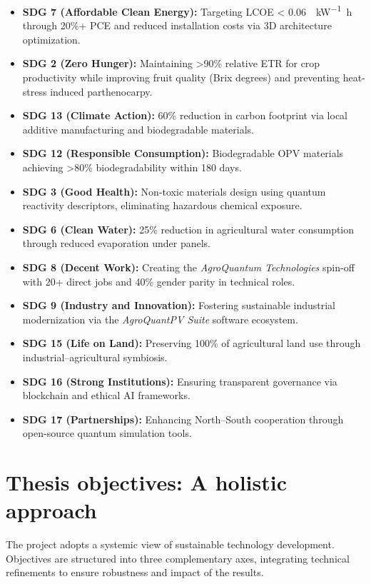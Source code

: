 \documentclass[12pt, a4paper]{article}
\begin{document}
\begin{itemize}
    \item \textbf{SDG 7 (Affordable Clean Energy):} Targeting LCOE < \SI{0.06}{\dollar\per\kilo\watt\hour} through 20\%+ PCE and reduced installation costs via 3D architecture optimization.
    \item \textbf{SDG 2 (Zero Hunger):} Maintaining >90\% relative ETR for crop productivity while improving fruit quality (Brix degrees) and preventing heat-stress induced parthenocarpy.
    \item \textbf{SDG 13 (Climate Action):} 60\% reduction in carbon footprint via local additive manufacturing and biodegradable materials.
    \item \textbf{SDG 12 (Responsible Consumption):} Biodegradable OPV materials achieving >80\% biodegradability within 180 days.
    \item \textbf{SDG 3 (Good Health):} Non-toxic materials design using quantum reactivity descriptors, eliminating hazardous chemical exposure.
    \item \textbf{SDG 6 (Clean Water):} 25\% reduction in agricultural water consumption through reduced evaporation under panels.
    \item \textbf{SDG 8 (Decent Work):} Creating the \textit{AgroQuantum Technologies} spin-off with 20+ direct jobs and 40\% gender parity in technical roles.
    \item \textbf{SDG 9 (Industry and Innovation):} Fostering sustainable industrial modernization via the \textit{AgroQuantPV Suite} software ecosystem.
    \item \textbf{SDG 15 (Life on Land):} Preserving 100\% of agricultural land use through industrial–agricultural symbiosis.
    \item \textbf{SDG 16 (Strong Institutions):} Ensuring transparent governance via blockchain and ethical AI frameworks.
    \item \textbf{SDG 17 (Partnerships):} Enhancing North–South cooperation through open-source quantum simulation tools.
\end{itemize}




\section{Thesis objectives: A holistic approach}
\label{sec:objectives}

The project adopts a systemic view of sustainable technology development. Objectives are structured into three complementary axes, integrating technical refinements to ensure robustness and impact of the results.
\end{document}
